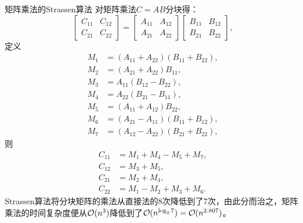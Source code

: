 \begin{theorem}
    {矩阵乘法的Strassen算法}{}
    对矩阵乘法$C=AB$分块得：
    \[
        \begin{bmatrix}
            C_{11}&C_{12}\\
            C_{21}&C_{22}
        \end{bmatrix}=\begin{bmatrix}
            A_{11}&A_{12}\\
            A_{21}&A_{22}
        \end{bmatrix}\begin{bmatrix}
            B_{11}&B_{12}\\
            B_{21}&B_{22}
        \end{bmatrix},
    \]
    定义 
    \begin{subequations}
        \begin{align}
            M_1&=(A_{11}+A_{22})(B_{11}+B_{22}),\\
            M_2&=(A_{21}+A_{22})B_{11},\\
            M_3&=A_{11}(B_{12}-B_{22}),\\
            M_4&=A_{22}(B_{21}-B_{11}),\\
            M_5&=(A_{11}+A_{12})B_{22},\\
            M_6&=(A_{21}-A_{11})(B_{11}+B_{12}),\\
            M_7&=(A_{12}-A_{22})(B_{21}+B_{22}),
        \end{align}
    \end{subequations}
    则
    \begin{subequations}
        \begin{align}
            C_{11}&=M_1+M_4-M_5+M_7,\\
            C_{12}&=M_3+M_5,\\
            C_{21}&=M_2+M_4,\\
            C_{22}&=M_1-M_2+M_3+M_6.
        \end{align}
    \end{subequations}
    Strassen算法将分块矩阵的乘法从直接法的8次降低到了7次，由此分而治之，矩阵乘法的时间复杂度便从$\mathcal{O}(n^3)$降低到了$\mathcal{O}(n^{\log_27})=\mathcal{O}(n^{2.807})$。
\end{theorem}

